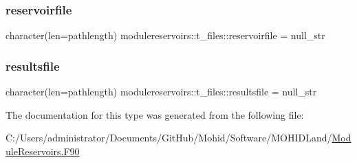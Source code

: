 \mbox{\label{structmodulereservoirs_1_1t__files_a1896e8dfd684246df3db5d95bc303d27}} 
\subsubsection{\texorpdfstring{reservoirfile}{reservoirfile}}
{\footnotesize\ttfamily character(len=pathlength) modulereservoirs\+::t\+\_\+files\+::reservoirfile = null\+\_\+str\hspace{0.3cm}{\ttfamily [private]}}

\mbox{\label{structmodulereservoirs_1_1t__files_ad986eded43a92642373a9ad83f78600c}} 
\subsubsection{\texorpdfstring{resultsfile}{resultsfile}}
{\footnotesize\ttfamily character(len=pathlength) modulereservoirs\+::t\+\_\+files\+::resultsfile = null\+\_\+str\hspace{0.3cm}{\ttfamily [private]}}



The documentation for this type was generated from the following file\+:\begin{DoxyCompactItemize}
\item 
C\+:/\+Users/administrator/\+Documents/\+Git\+Hub/\+Mohid/\+Software/\+M\+O\+H\+I\+D\+Land/\mbox{\hyperlink{_module_reservoirs_8_f90}{Module\+Reservoirs.\+F90}}\end{DoxyCompactItemize}
